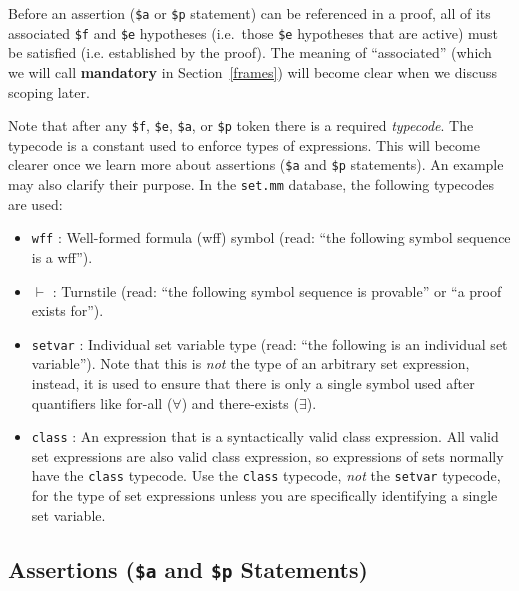 Before an assertion (\texttt{\$a} or \texttt{\$p} statement) can be
referenced in a proof, all of its associated \texttt{\$f} and \texttt{\$e} hypotheses
(i.e.\ those \texttt{\$e} hypotheses that are active) must be satisfied (i.e.
established by the proof).  The meaning of ``associated'' (which we will call
{\bf mandatory} in Section~\ref{frames}) will become clear when we discuss
scoping later.

Note that after any \texttt{\$f}, \texttt{\$e},
\texttt{\$a}, or \texttt{\$p} token there is a required
\textit{typecode}.
The typecode is a constant used to enforce types of expressions.
This will become clearer once we learn more about
assertions (\texttt{\$a} and \texttt{\$p} statements).
An example may also clarify their purpose.
In the
\texttt{set.mm}%
database,
the following typecodes are used:

\begin{itemize}
\item \texttt{wff} :
  Well-formed formula (wff) symbol
  (read: ``the following symbol sequence is a wff'').
\item \texttt{$\vdash$} :
  Turnstile (read: ``the following symbol sequence is provable'' or
  ``a proof exists for'').
\item \texttt{setvar} :
  Individual set variable type (read: ``the following is an
  individual set variable'').
  Note that this is \textit{not} the type of an arbitrary set expression,
  instead, it is used to ensure that there is only a single symbol used
  after quantifiers like for-all ($\forall$) and there-exists ($\exists$).
\item \texttt{class} :
  An expression that is a syntactically valid class expression.
  All valid set expressions are also valid class expression, so expressions
  of sets normally have the \texttt{class} typecode.
  Use the \texttt{class} typecode,
  \textit{not} the \texttt{setvar} typecode,
  for the type of set expressions unless you are specifically identifying
  a single set variable.
\end{itemize}

\subsection{Assertions (\texttt{\$a} and \texttt{\$p} Statements)}

